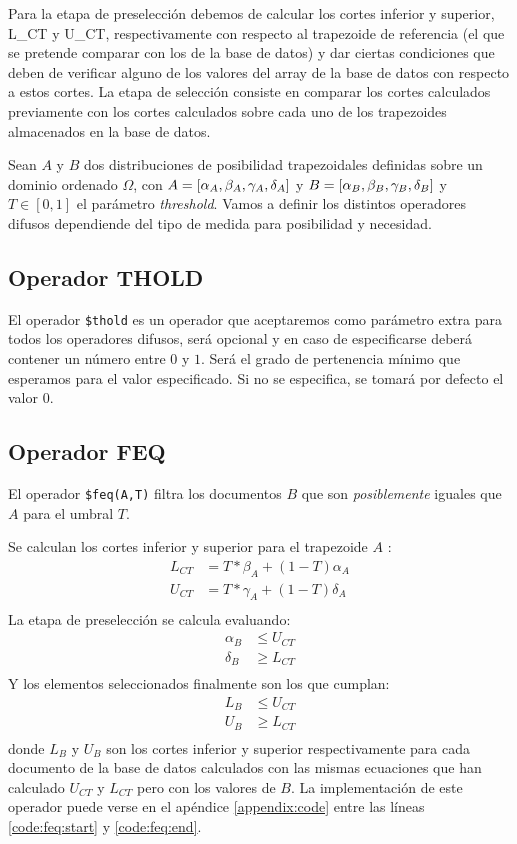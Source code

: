 Para la etapa de preselección debemos de calcular los cortes inferior y superior, L\_CT y U\_CT, respectivamente con respecto al trapezoide de referencia (el que se pretende comparar con los de la base de datos) y dar ciertas condiciones que deben de verificar alguno de los valores del array de la base de datos con respecto a estos cortes. La etapa de selección consiste en comparar los cortes calculados previamente con los cortes calculados sobre cada uno de los trapezoides almacenados en la base de datos.

Sean $A$ y $B$ dos distribuciones de posibilidad trapezoidales definidas sobre un dominio ordenado $\Omega$, con $A = [\alpha_A, \beta_A, \gamma_A, \delta_A]$ y $B=[\alpha_B, \beta_B, \gamma_B, \delta_B]$ y $T \in [0,1]$ el parámetro \textit{threshold}. Vamos a definir los distintos operadores difusos dependiende del tipo de medida para posibilidad y necesidad.

\subsection{Operador THOLD}

El operador \texttt{\$thold} es un operador que aceptaremos como parámetro extra para todos los operadores difusos, será opcional y en caso de especificarse deberá contener un número entre $0$ y $1$. Será el grado de pertenencia mínimo que esperamos para el valor especificado. Si no se especifica, se tomará por defecto el valor $0$.

\subsection{Operador FEQ}

El operador \texttt{\$feq(A,T)} filtra los documentos $B$ que son \textit{posiblemente} iguales que $A$ para el umbral $T$.

Se calculan los cortes inferior y superior para el trapezoide $A$ \cite{indexingstrategies}:
%
\begin{align*}
    L_{CT} &= T * \beta_A + (1-T)\alpha_A \\
    U_{CT} &= T * \gamma_A + (1-T)\delta_A \\
\end{align*}
%
La etapa de preselección se calcula evaluando:
%
\begin{align*}
    \alpha_B &\leq U_{CT} \\
    \delta_B &\geq L_{CT} \\
\end{align*}
%
Y los elementos seleccionados finalmente son los que cumplan:
%
\begin{align*}
    L_B &\leq U_{CT} \\
    U_B &\geq L_{CT} \\
\end{align*}
%
donde $L_B$ y $U_B$ son los cortes inferior y superior respectivamente para cada documento de la base de datos calculados con las mismas ecuaciones que han calculado $U_{CT}$ y $L_{CT}$ pero con los valores de $B$.
La implementación de este operador puede verse en el apéndice \ref{appendix:code} entre las líneas \ref{code:feq:start} y \ref{code:feq:end}.

